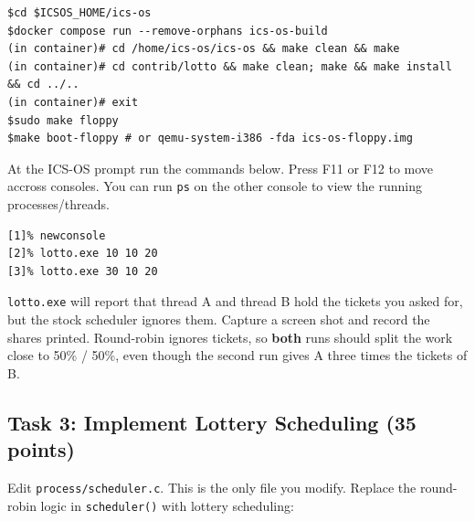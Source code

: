 \documentclass[a4paper, 11pt,oneside]{article}
\begin{document}
\begin{verbatim}
$cd $ICSOS_HOME/ics-os
$docker compose run --remove-orphans ics-os-build
(in container)# cd /home/ics-os/ics-os && make clean && make
(in container)# cd contrib/lotto && make clean; make && make install && cd ../..
(in container)# exit
$sudo make floppy
$make boot-floppy # or qemu-system-i386 -fda ics-os-floppy.img
\end{verbatim}

At the ICS-OS prompt run the commands below. Press F11 or F12 to move accross consoles. You can run \texttt{ps} on the other console to view the running processes/threads.

\begin{verbatim}
[1]% newconsole 
[2]% lotto.exe 10 10 20
[3]% lotto.exe 30 10 20
\end{verbatim}

\texttt{lotto.exe} will report that thread A and thread B hold the tickets you asked for, but the stock scheduler ignores them. Capture a screen shot and record the shares printed. Round-robin ignores tickets, so \textbf{both} runs should split the work close to 50\% / 50\%, even though the second run gives A three times the tickets of B.

\subsection*{Task 3: Implement Lottery Scheduling (35 points)}
Edit \texttt{process/scheduler.c}. This is the only file you modify. Replace the round-robin logic in \texttt{scheduler()} with lottery scheduling:
\end{document}
